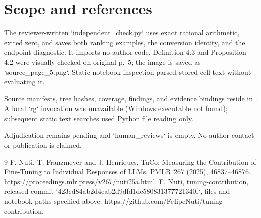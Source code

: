 \documentclass[10pt]{article}
\begin{document}
\section*{Scope and references}
The reviewer-written `independent\_check.py` uses exact rational arithmetic, exited zero, and saves both ranking examples, the conversion identity, and the endpoint diagnostic. It imports no author code. Definition 4.3 and Proposition 4.2 were visually checked on original p. 5; the image is saved as `source\_page\_5.png`. Static notebook inspection parsed stored cell text without evaluating it.\par
Source manifests, tree hashes, coverage, findings, and evidence bindings reside in . A local `rg` invocation was unavailable (Windows executable not found); subsequent static text searches used Python file reading only.\par
Adjudication remains pending and `human\_reviews` is empty. No author contact or publication is claimed.\par
9 F. Nuti, T. Franzmeyer and J. Henriques, TuCo: Measuring the Contribution of Fine-Tuning to Individual Responses of LLMs, PMLR 267 (2025), 46837–46876. https://proceedings.mlr.press/v267/nuti25a.html. F. Nuti, tuning-contribution, released commit `423cd84ab2d4eab2d9dfd1de580831377721340f`, files and notebook paths specified above. https://github.com/FelipeNuti/tuning-contribution.\par
\end{document}
